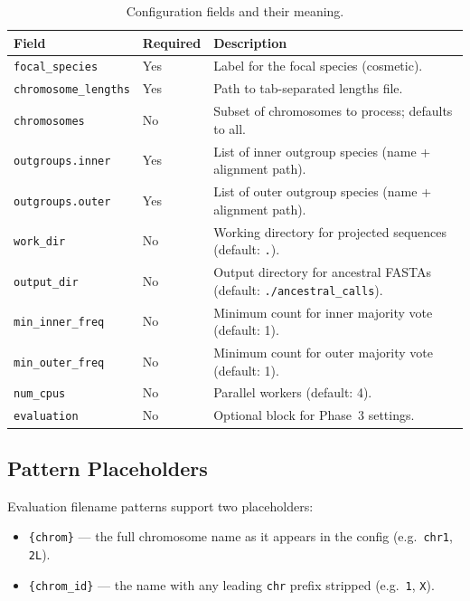 \documentclass[11pt,a4paper]{article}
\begin{document}
\begin{table}[H]
\centering
\caption{Configuration fields and their meaning.}
\label{tab:config}
\begin{tabular}{p{3.5cm}p{2cm}p{7.5cm}}
\toprule
\textbf{Field} & \textbf{Required} & \textbf{Description} \\
\midrule
\texttt{focal\_species} & Yes & Label for the focal species (cosmetic). \\
\texttt{chromosome\_lengths} & Yes & Path to tab-separated lengths file. \\
\texttt{chromosomes} & No & Subset of chromosomes to process; defaults to all. \\
\texttt{outgroups.inner} & Yes & List of inner outgroup species (name + alignment path). \\
\texttt{outgroups.outer} & Yes & List of outer outgroup species (name + alignment path). \\
\texttt{work\_dir} & No & Working directory for projected sequences (default: \texttt{.}). \\
\texttt{output\_dir} & No & Output directory for ancestral FASTAs (default: \texttt{./ancestral\_calls}). \\
\texttt{min\_inner\_freq} & No & Minimum count for inner majority vote (default: 1). \\
\texttt{min\_outer\_freq} & No & Minimum count for outer majority vote (default: 1). \\
\texttt{num\_cpus} & No & Parallel workers (default: 4). \\
\texttt{evaluation} & No & Optional block for Phase~3 settings. \\
\bottomrule
\end{tabular}
\end{table}

\subsection{Pattern Placeholders}

Evaluation filename patterns support two placeholders:
\begin{itemize}[leftmargin=2em]
    \item \texttt{\{chrom\}} --- the full chromosome name as it appears in the config (e.g.\ \texttt{chr1}, \texttt{2L}).
    \item \texttt{\{chrom\_id\}} --- the name with any leading \texttt{chr} prefix stripped (e.g.\ \texttt{1}, \texttt{X}).
\end{itemize}
\end{document}
